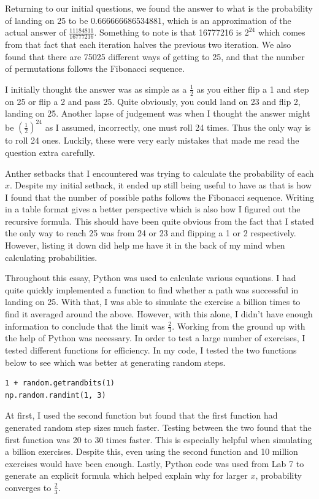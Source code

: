 \documentclass[11pt]{article}
\newcommand{\keywordfont}{\textsc}
\newcommand{\keyword}[1]{%
  \marginpar{\raggedright\small\keywordfont{#1}}}
\begin{document}
Returning \keyword{Check} to our initial questions, we found the answer to what is the probability of landing on 25 to be 0.666666686534881, which is an approximation of the actual answer of $\frac{11184811}{16777216}$. Something to note is that 16777216 is $2^{24}$ which comes from that fact that each iteration halves the previous two iteration. We also found that there are 75025 different ways of getting to 25, and that the number of permutations follows the Fibonacci sequence. 

I initially thought \keyword{Reflect} the answer was as simple as a $\frac{1}{2}$ as you either flip a 1 and step on 25 or flip a 2 and pass 25. Quite obviously, you could land on 23 and flip 2, landing on 25. Another lapse of judgement was when I thought the answer might be $(\frac{1}{2})^{24}$ as I assumed, incorrectly, one must roll 24 times. Thus the only way is to roll 24 ones. Luckily, these were very early mistakes that made me read the question extra carefully. 

Anther setbacks \keyword{Reflect} that I encountered was trying to calculate the probability of each $x$. Despite my initial setback, it ended up still being useful to have as that is how I found that the number of possible paths follows the Fibonacci sequence. Writing in a table format gives a better perspective which is also how I figured out the recursive formula. This should have been quite obvious from the fact that I stated the only way to reach 25 was from 24 or 23 and flipping a 1 or 2 respectively. However, listing it down did help me have it in the back of my mind when calculating probabilities. 
 
Throughout \keyword{Reflect} this essay, Python was used to calculate various equations. I had quite quickly implemented a function to find whether a path was successful in landing on 25. With that, I was able to simulate the exercise a billion times to find it averaged around the above. However, with this alone, I didn't have enough information to conclude that the limit was $\frac{2}{3}$. Working from the ground up with the help of Python was necessary. In order to test a large number of exercises, I tested different functions for efficiency. In my code, I tested the two functions below to see which was better at generating random steps.
\begin{verbatim}
1 + random.getrandbits(1)
np.random.randint(1, 3)
\end{verbatim}
At first, I used the second function but found that the first function had generated random step sizes much faster. Testing between the two found that the first function was 20 to 30 times faster. This is especially helpful when simulating a billion exercises. Despite this, even using the second function and 10 million exercises would have been enough. Lastly, Python code was used from Lab 7 to generate an explicit formula which helped explain why for larger $x$, probability converges to $\frac{2}{3}$.
  
\end{document}
